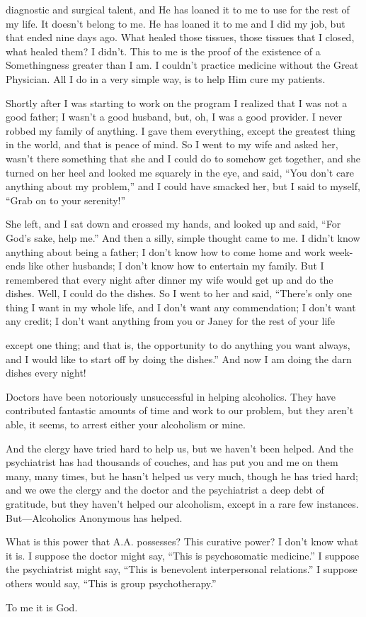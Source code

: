 diagnostic and surgical talent, and He has loaned it to me to use for the rest of my life. It doesn’t belong to me. He has loaned it to me and I did my job, but that ended nine days ago. What healed those tissues, those tissues that I closed, what healed them? I didn’t. This to me is the proof of the existence of a Somethingness greater than I am. I couldn’t practice medicine without the Great Physician. All I do in a very simple way, is to help Him cure my patients.

Shortly after I was starting to work on the program I realized that I was not a good father; I wasn’t a good husband, but, oh, I was a good provider. I never robbed my family of anything. I gave them everything, except the greatest thing in the world, and that is peace of mind. So I went to my wife and asked her, wasn’t there something that she and I could do to somehow get together, and she turned on her heel and looked me squarely in the eye, and said, “You don’t care anything about my problem,” and I could have smacked her, but I said to myself, “Grab on to your serenity!”

She left, and I sat down and crossed my hands, and looked up and said, “For God’s sake, help me.” And then a silly, simple thought came to me. I didn’t know anything about being a father; I don’t know how to come home and work week-ends like other husbands; I don’t know how to entertain my family. But I remembered that every night after dinner my wife would get up and do the dishes. Well, I could do the dishes. So I went to her and said, “There’s only one thing I want in my whole life, and I don’t want any commendation; I don’t want any credit; I don’t want anything from you or Janey for the rest of your life

except one thing; and that is, the opportunity to do anything you want always, and I would like to start off by doing the dishes.” And now I am doing the darn dishes every night!

Doctors have been notoriously unsuccessful in helping alcoholics. They have contributed fantastic amounts of time and work to our problem, but they aren’t able, it seems, to arrest either your alcoholism or mine.

And the clergy have tried hard to help us, but we haven’t been helped. And the psychiatrist has had thousands of couches, and has put you and me on them many, many times, but he hasn’t helped us very much, though he has tried hard; and we owe the clergy and the doctor and the psychiatrist a deep debt of gratitude, but they haven’t helped our alcoholism, except in a rare few instances. But—Alcoholics Anonymous has helped.

What is this power that A.A. possesses? This curative power? I don’t know what it is. I suppose the doctor might say, “This is psychosomatic medicine.” I suppose the psychiatrist might say, “This is benevolent interpersonal relations.” I suppose others would say, “This is group psychotherapy.”

To me it is God.

